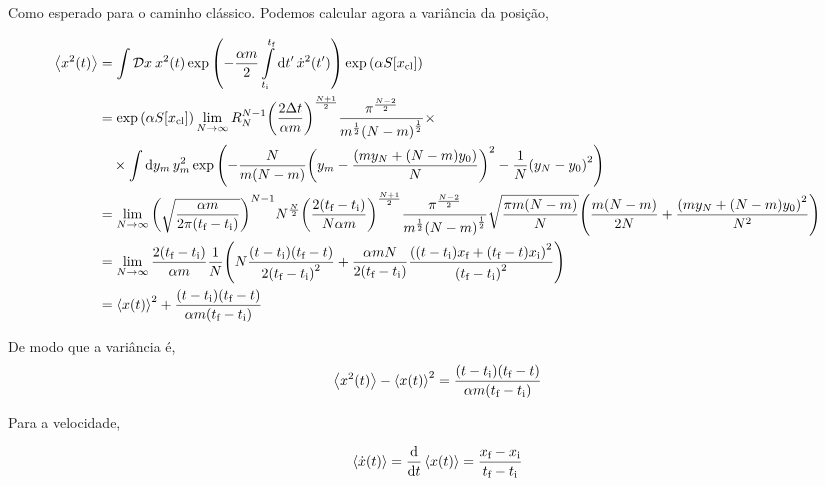 \documentclass[twoside]{amsart}
\newcommand{\Dd}[1]{\mathcal D #1\: }
\numberwithin{equation}{section}
\begin{document}
Como esperado para o caminho clássico. Podemos calcular agora a variância da posição,

\begin{align*}
    \expval{x^2\qty(t)}&=\int\Dd xx^2\qty(t)\exp\qty(-\frac{\alpha m}{2}\int\limits_{t_{\textnormal i}}^{t_{\textnormal f}}\dd{t'}\dot x^2\qty(t'))\exp\qty(\alpha S\qty[x_{\textnormal{cl}}])\\
    &=\exp\qty(\alpha S\qty[x_{\textnormal{cl}}])\lim\limits_{N\rightarrow\infty}R_N^{N-1}\qty(\frac{2\Delta t}{\alpha m})^{\frac {N+1}{2}}\frac{\pi^{\frac{N-2}{2}}}{m^{\frac12}\qty(N-m)^{\frac12}}\times\\
    &\quad\times\int\dd{y_m}y^2_m\exp\qty(-\frac{N}{m\qty(N-m)}\qty(y_m-\frac{\qty(my_N+\qty(N-m)y_0)}{N})^2-\frac1N\qty(y_N-y_0)^2)\\
    &=\lim\limits_{N\rightarrow\infty}\qty(\sqrt{\frac{\alpha m}{2\pi\qty(t_{\textnormal f}-t_{\textnormal i})}})^{N-1}N^\frac{N}{2}\qty(\frac{2\qty( t_{\textnormal f}-t_{\textnormal i})}{N\alpha m})^{\frac{N+1}{2}}\frac{\pi^{\frac{N-2}{2}}}{m^{\frac12}\qty(N-m)^{\frac12}}\sqrt{\frac{\pi m\qty(N-m)}{N}}\qty(\frac{m\qty(N-m)}{2N}+\frac{\qty(my_N+\qty(N-m)y_0)^2}{N^2})\\
    &=\lim\limits_{N\rightarrow\infty}\frac{2\qty( t_{\textnormal f}-t_{\textnormal i})}{\alpha m}\frac{1}{N}\qty(N\frac{\qty(t-t_{\textnormal i})\qty(t_{\textnormal f}-t)}{2\qty(t_{\textnormal f}-t_{\textnormal i})^2}+\frac{\alpha m N}{2\qty(t_{\textnormal f}-t_{\textnormal i})}\frac{\qty(\qty(t-t_{\textnormal i})x_{\textnormal f}+\qty(t_{\textnormal f}-t)x_{\textnormal i})^2}{\qty(t_{\textnormal f}-t_{\textnormal i})^2})\\
    &=\expval{x\qty(t)}^2+\frac{\qty(t-t_{\textnormal i})\qty(t_{\textnormal f}-t)}{\alpha m\qty(t_{\textnormal f}-t_{\textnormal i})}
\end{align*}

De modo que a variância é, $$\expval{x^2\qty(t)}-\expval{x\qty(t)}^2=\frac{\qty(t-t_{\textnormal i})\qty(t_{\textnormal f}-t)}{\alpha m\qty(t_{\textnormal f}-t_{\textnormal i})}$$

Para a velocidade,

$$\expval{\dot x\qty(t)}=\dv{}{t}\expval{x\qty(t)}=\frac{x_{\textnormal f}-x_{\textnormal i}}{t_{\textnormal f}-t_{\textnormal i}}$$

  
  
\end{document}
